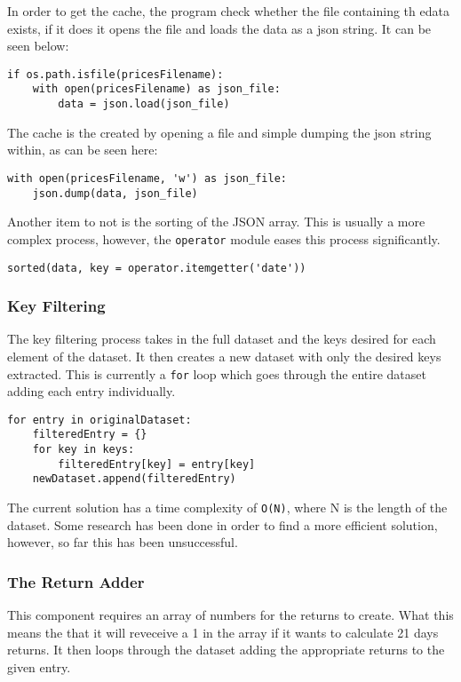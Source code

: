 In order to get the cache, the program check whether the file containing th edata exists, if it does it opens the file and loads the data as a json string. It can be seen below:
\begin{lstlisting}[caption=Loading Prices Cache]
if os.path.isfile(pricesFilename):
    with open(pricesFilename) as json_file:
        data = json.load(json_file)
\end{lstlisting}
The cache is the created by opening a file and simple dumping the json string within, as can be seen here:
\begin{lstlisting}[caption=Creation of Prices Cache]
with open(pricesFilename, 'w') as json_file:
    json.dump(data, json_file)
\end{lstlisting}

Another item to not is the sorting of the JSON array. This is usually a more complex process, however, the \verb|operator| module eases this process significantly.
\begin{lstlisting}[caption=Sort JSON Array]
sorted(data, key = operator.itemgetter('date'))
\end{lstlisting}

\subsubsection{Key Filtering}

The key filtering process takes in the full dataset and the keys desired for each element of the dataset. It then creates a new dataset with only the desired keys extracted. This is currently a \verb|for| loop which goes through the entire dataset adding each entry individually.
\begin{lstlisting}[caption=Filtering Desired Keys]
for entry in originalDataset:
    filteredEntry = {}
    for key in keys:
        filteredEntry[key] = entry[key]
    newDataset.append(filteredEntry)
\end{lstlisting}
The current solution has a time complexity of \verb|O(N)|, where N is the length of the dataset. Some research has been done in order to find a more efficient solution, however, so far this has been unsuccessful.

\subsubsection{The Return Adder}

This component requires an array of numbers for the returns to create. What this means the that it will reveceive a 1 in the array if it wants to calculate 21 days returns. It then loops through the dataset adding the appropriate returns to the given entry.

